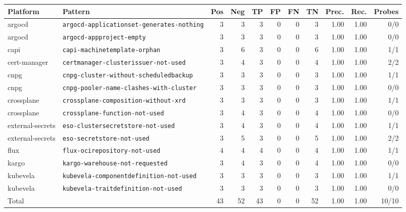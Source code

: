 \begin{tabular}{llrrrrrrrrr}
\toprule
Platform & Pattern & Pos & Neg & TP & FP & FN & TN & Prec. & Rec. & Probes \\
\midrule
argocd & \texttt{argocd-applicationset-generates-nothing} & 3 & 3 & 3 & 0 & 0 & 3 & 1.00 & 1.00 & 0/0 \\
argocd & \texttt{argocd-appproject-empty} & 3 & 3 & 3 & 0 & 0 & 3 & 1.00 & 1.00 & 0/0 \\
capi & \texttt{capi-machinetemplate-orphan} & 3 & 6 & 3 & 0 & 0 & 6 & 1.00 & 1.00 & 1/1 \\
cert-manager & \texttt{certmanager-clusterissuer-not-used} & 3 & 4 & 3 & 0 & 0 & 4 & 1.00 & 1.00 & 2/2 \\
cnpg & \texttt{cnpg-cluster-without-scheduledbackup} & 3 & 3 & 3 & 0 & 0 & 3 & 1.00 & 1.00 & 1/1 \\
cnpg & \texttt{cnpg-pooler-name-clashes-with-cluster} & 3 & 3 & 3 & 0 & 0 & 3 & 1.00 & 1.00 & 0/0 \\
crossplane & \texttt{crossplane-composition-without-xrd} & 3 & 3 & 3 & 0 & 0 & 3 & 1.00 & 1.00 & 1/1 \\
crossplane & \texttt{crossplane-function-not-used} & 3 & 4 & 3 & 0 & 0 & 4 & 1.00 & 1.00 & 0/0 \\
external-secrets & \texttt{eso-clustersecretstore-not-used} & 3 & 4 & 3 & 0 & 0 & 4 & 1.00 & 1.00 & 1/1 \\
external-secrets & \texttt{eso-secretstore-not-used} & 3 & 5 & 3 & 0 & 0 & 5 & 1.00 & 1.00 & 2/2 \\
flux & \texttt{flux-ocirepository-not-used} & 4 & 4 & 4 & 0 & 0 & 4 & 1.00 & 1.00 & 1/1 \\
kargo & \texttt{kargo-warehouse-not-requested} & 3 & 4 & 3 & 0 & 0 & 4 & 1.00 & 1.00 & 0/0 \\
kubevela & \texttt{kubevela-componentdefinition-not-used} & 3 & 3 & 3 & 0 & 0 & 3 & 1.00 & 1.00 & 1/1 \\
kubevela & \texttt{kubevela-traitdefinition-not-used} & 3 & 3 & 3 & 0 & 0 & 3 & 1.00 & 1.00 & 0/0 \\
\midrule
\multicolumn{2}{l}{Total} & 43 & 52 & 43 & 0 & 0 & 52 & 1.00 & 1.00 & 10/10 \\
\bottomrule
\end{tabular}
